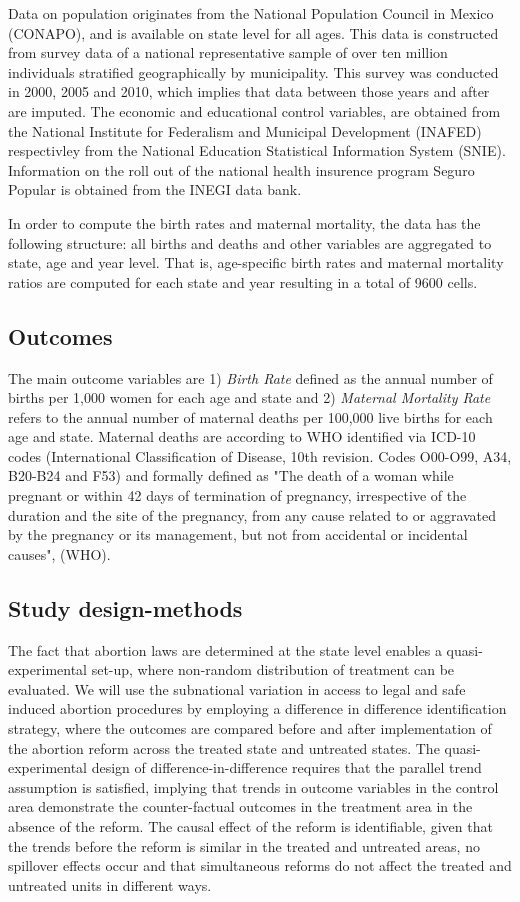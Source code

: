\documentclass[a4paper, 11pt]{article}
\begin{document}
\begin{spacing}{1.5}
\begin{multicols}{2}
 Data on population originates from the National Population Council in Mexico (CONAPO), and is available on state level for all ages. This data is constructed from survey data of a national representative sample of over ten million individuals stratified geographically by municipality. This survey was conducted in 2000, 2005 and 2010, which implies that data between those years and after are imputed.  The economic and educational control variables, are obtained from the National Institute for Federalism and Municipal Development (INAFED) respectivley from the National Education Statistical Information System (SNIE). Information on the roll out of the national health insurence program Seguro Popular is obtained from the INEGI data bank.
 
 In order to compute the birth rates and maternal mortality, the data has the following structure: all births and deaths and other variables are aggregated to state, age and year level. That is, age-specific birth rates and maternal mortality ratios are computed for each state and year resulting in a total of 9600 cells.
 
 
\subsection{Outcomes} 
 The main outcome variables are 1) \textit{Birth Rate} defined as the annual number of births per 1,000 women for each age and state and 2) \textit{Maternal Mortality Rate} refers to the annual number of maternal deaths per 100,000 live births for each age and state. Maternal deaths are according to WHO identified via ICD-10 codes (International Classification of Disease, 10th revision. Codes O00-O99, A34, B20-B24 and F53) and formally defined as "The death of a woman while pregnant or within 42 days of termination of pregnancy, irrespective of the duration and the site of the pregnancy, from any cause related to or aggravated by the pregnancy or its management, but not from accidental or incidental causes", (WHO).
\subsection{Study design-methods}
The fact that abortion laws are determined at the state level enables a quasi-experimental set-up, where non-random distribution of treatment can be evaluated. We will use the subnational variation in access to legal and safe induced abortion procedures by employing a difference in difference identification strategy, where the outcomes are compared before and after implementation of the abortion reform across the treated state and untreated states. The quasi-experimental design of difference-in-difference requires that the parallel trend assumption is satisfied, implying that trends in outcome variables in the control area demonstrate the counter-factual outcomes in the treatment area in the absence of the reform. The causal effect of the reform is identifiable, given that the trends before the reform is similar in the treated and untreated areas, no spillover effects occur and that simultaneous reforms do not affect the treated and untreated units in different ways. 


\end{multicols}
\end{spacing}
\end{document}
